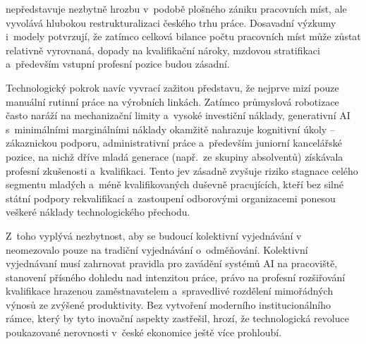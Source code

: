  nepředstavuje nezbytně hrozbu v~podobě plošného zániku pracovních míst, ale vyvolává hlubokou restrukturalizaci českého trhu práce. Dosavadní výzkumy i~modely potvrzují, že zatímco celková bilance počtu pracovních míst může zůstat relativně vyrovnaná, dopady na kvalifikační nároky, mzdovou stratifikaci a~především vstupní profesní pozice budou zásadní.~\cite{Weber_Industrie40_2015}~\cite{Massenkoff_LaborMarketAI_2026}\par

Technologický pokrok navíc vyvrací zažitou představu, že nejprve mizí pouze manuální rutinní práce na výrobních linkách. Zatímco průmyslová robotizace často naráží na mechanizační limity a~vysoké investiční náklady, generativní \acs{AI} s~minimálními marginálními náklady okamžitě nahrazuje kognitivní úkoly -- zákaznickou podporu, administrativní práce a~především juniorní kancelářské pozice, na nichž dříve mladá generace (např.~ze skupiny absolventů) získávala profesní zkušenosti a~kvalifikaci. Tento jev zásadně zvyšuje riziko stagnace celého segmentu mladých a~méně kvalifikovaných duševně pracujících, kteří bez silné státní podpory rekvalifikací a~zastoupení odborovými organizacemi ponesou veškeré náklady technologického přechodu.~\cite{Petit_AIEmploymentImpact_EU_2026}\par

Z~toho vyplývá nezbytnost, aby se budoucí kolektivní vyjednávání v~ neomezovalo pouze na tradiční vyjednávání o~odměňování. Kolektivní vyjednávaní musí zahrnovat pravidla pro zavádění systémů \acs{AI} na pracoviště, stanovení přísného dohledu nad intenzitou práce, právo na profesní rozšiřování kvalifikace hrazenou zaměstnavatelem a~spravedlivé rozdělení mimořádných výnosů ze zvýšené produktivity. Bez vytvoření moderního institucionálního rámce, který by tyto inovační aspekty zastřešil, hrozí, že technologická revoluce poukazované nerovnosti v~české ekonomice ještě více prohloubí.~\cite{OECD_GoodJobsForAll_2018}~\cite{NERV_NavrhyRustu2025}\par
